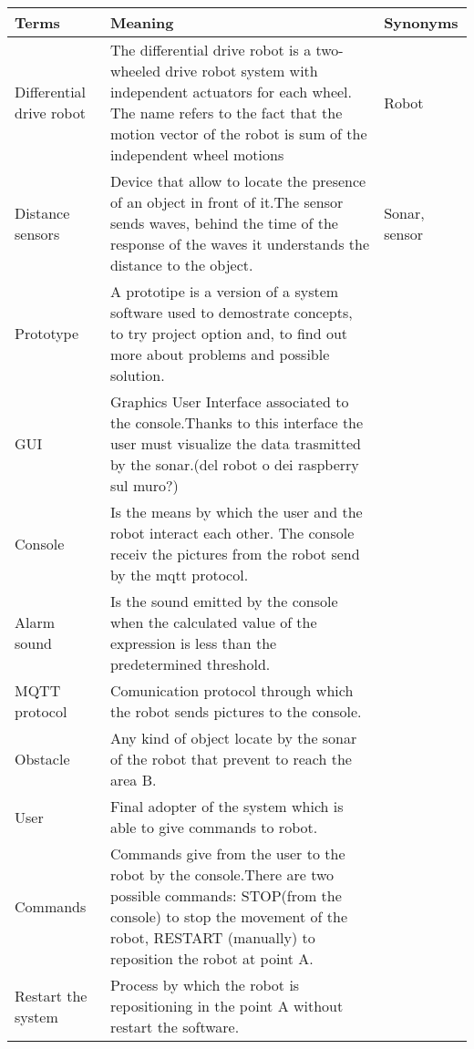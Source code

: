 \documentclass[a4paper]{article}
\begin{document}
\begin{tabular}{ | m{2cm} | m{10cm}| m{2cm} | }
		\hline
	Terms&Meaning&Synonyms\\ 
	\hline
	Differential drive robot& The differential drive robot is a two-wheeled drive robot system with independent actuators for each wheel. The name refers to the fact that the motion vector of the robot is sum of the independent wheel motions&Robot\\ 
	\hline
	Distance sensors&Device that allow to locate the presence of an object in front of it.The sensor sends waves, behind the time of the response of the waves it understands the distance to the object.&Sonar, sensor\\
	\hline
	Prototype&A prototipe is a version of a system software used to demostrate concepts, to try project option and, to find out more about problems and possible solution.&\\
	\hline
	GUI&Graphics User Interface associated to the console.Thanks to this interface the user must visualize the data trasmitted by the sonar.(del robot o dei raspberry sul muro?) & \\
	\hline
	Console&Is the means by which the user and the robot interact each other. The console receiv the pictures from the robot send by the mqtt protocol.&\\
	\hline
	Alarm sound&Is the sound emitted by the console when the calculated value of the expression is less than the predetermined threshold.&\\
	\hline
	MQTT protocol&Comunication protocol through which the robot sends pictures to the console.&\\
	\hline
	Obstacle&Any kind of object locate by the sonar of the robot that prevent to reach the area B.&\\
	\hline
	User&Final adopter of the system which is able to give commands to robot.&\\
	\hline
	Commands&Commands give from the user to the robot by the console.There are two possible commands: STOP(from the console) to stop the movement of the robot, RESTART (manually) to reposition the robot at point A.&\\
	\hline
	Restart the system&Process by which the robot is repositioning in the point A without restart the software.&\\
	\hline 
\end{tabular}

\end{document}

